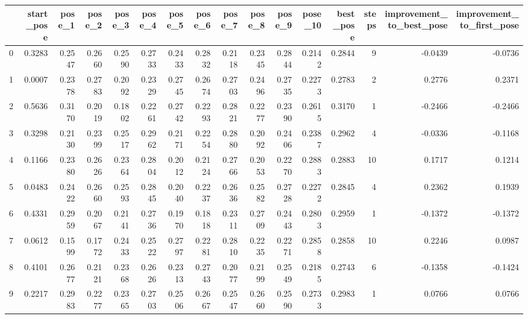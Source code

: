 \begin{tabular}{lrrrrrrrrrrrrrrr}
\toprule
{} &  start\_pose &  pose\_1 &  pose\_2 &  pose\_3 &  pose\_4 &  pose\_5 &  pose\_6 &  pose\_7 &  pose\_8 &  pose\_9 &  pose\_10 &  best\_pose &  steps &  improvement\_to\_best\_pose &  improvement\_to\_first\_pose \\
\midrule
0 &      0.3283 &  0.2547 &  0.2660 &  0.2590 &  0.2733 &  0.2433 &  0.2832 &  0.2118 &  0.2345 &  0.2844 &   0.2142 &     0.2844 &      9 &                   -0.0439 &                    -0.0736 \\
1 &      0.0007 &  0.2378 &  0.2783 &  0.2092 &  0.2329 &  0.2745 &  0.2674 &  0.2703 &  0.2496 &  0.2735 &   0.2273 &     0.2783 &      2 &                    0.2776 &                     0.2371 \\
2 &      0.5636 &  0.3170 &  0.2019 &  0.1802 &  0.2261 &  0.2742 &  0.2293 &  0.2821 &  0.2277 &  0.2390 &   0.2615 &     0.3170 &      1 &                   -0.2466 &                    -0.2466 \\
3 &      0.3298 &  0.2130 &  0.2399 &  0.2517 &  0.2962 &  0.2171 &  0.2254 &  0.2880 &  0.2092 &  0.2406 &   0.2387 &     0.2962 &      4 &                   -0.0336 &                    -0.1168 \\
4 &      0.1166 &  0.2380 &  0.2626 &  0.2364 &  0.2804 &  0.2012 &  0.2124 &  0.2766 &  0.2053 &  0.2270 &   0.2883 &     0.2883 &     10 &                    0.1717 &                     0.1214 \\
5 &      0.0483 &  0.2422 &  0.2660 &  0.2593 &  0.2845 &  0.2040 &  0.2237 &  0.2636 &  0.2582 &  0.2728 &   0.2272 &     0.2845 &      4 &                    0.2362 &                     0.1939 \\
6 &      0.4331 &  0.2959 &  0.2067 &  0.2141 &  0.2736 &  0.1970 &  0.1818 &  0.2311 &  0.2709 &  0.2443 &   0.2803 &     0.2959 &      1 &                   -0.1372 &                    -0.1372 \\
7 &      0.0612 &  0.1599 &  0.1772 &  0.2433 &  0.2522 &  0.2797 &  0.2281 &  0.2810 &  0.2235 &  0.2271 &   0.2858 &     0.2858 &     10 &                    0.2246 &                     0.0987 \\
8 &      0.4101 &  0.2677 &  0.2121 &  0.2368 &  0.2626 &  0.2313 &  0.2743 &  0.2077 &  0.2199 &  0.2549 &   0.2185 &     0.2743 &      6 &                   -0.1358 &                    -0.1424 \\
9 &      0.2217 &  0.2983 &  0.2277 &  0.2365 &  0.2703 &  0.2506 &  0.2667 &  0.2547 &  0.2660 &  0.2590 &   0.2733 &     0.2983 &      1 &                    0.0766 &                     0.0766 \\
\bottomrule
\end{tabular}

